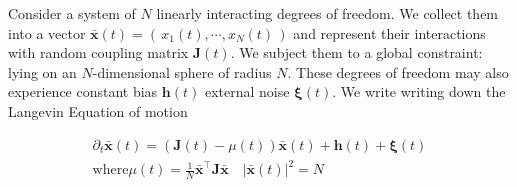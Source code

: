 Consider a system of $N$ linearly interacting degrees of freedom. We collect them into a vector $\mathbf{\bar x}(t) = \left(\,x_1(t),\cdots, x_N(t)\,\right)$ and represent their interactions with random coupling matrix $\mathbf{J}(t)$. We subject them to a global constraint: lying on an $N$-dimensional sphere of radius $N$. These degrees of freedom may also experience constant bias $\mathbf{h}(t)$ external noise $\boldsymbol\xi(t)$. We write  writing down the Langevin Equation of motion

\begin{align}
\partial_t\mathbf{\bar x}(t) = (\mathbf{J}(t)-\mu(t))\mathbf{\bar x}(t)+\mathbf{h}(t)+\boldsymbol\xi(t) \\
\mathrm{where}\mu(t)=\frac{1}{N}\mathbf{\bar x}^{\top}\mathbf{J}\mathbf{\bar x}\quad|\mathbf{\bar x}(t)|^2=N
\end{align}